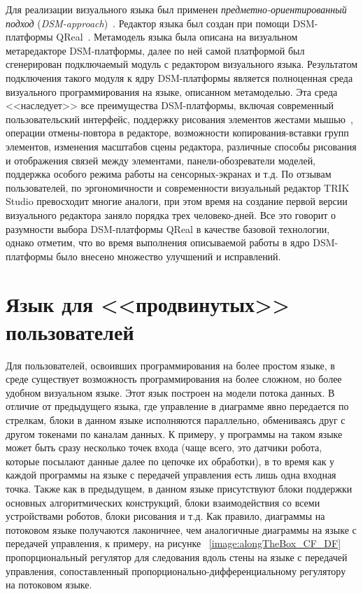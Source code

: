 \documentclass[a5paper]{article}
\begin{document}
Для реализации визуального языка был применен \textit{предметно-ориентированный подход} (\textit{DSM-approach})~\cite{koznov2008}. Редактор языка был создан при помощи DSM-платформы QReal~\cite{qrealMeta,kuzenkova2013qreal}. Метамодель языка была описана на визуальном метаредакторе DSM-платформы, далее по ней самой платформой был сгенерирован подключаемый модуль с редактором визуального языка. Результатом подключения такого модуля к ядру DSM-платформы является полноценная среда визуального программирования на языке, описанном метамоделью. Эта среда <<наследует>> все преимущества DSM-платформы, включая современный пользовательский интерфейс, поддержку рисования элементов жестами мышью~\cite{osechkina2010gestures,osechkina2012multistroke}, операции отмены-повтора в редакторе, возможности копирования-вставки групп элементов, изменения масштабов сцены редактора, различные способы рисования и отображения связей между элементами, панели-обозреватели моделей, поддержка особого режима работы на сенсорных-экранах и т.д. По отзывам пользователей, по эргономичности и современности визуальный редактор TRIK Studio превосходит многие аналоги, при этом время на создание первой версии визуального редактора заняло порядка трех человеко-дней. Все это говорит о разумности выбора DSM-платформы QReal в качестве базовой технологии, однако отметим, что во время выполнения описываемой работы в ядро DSM-платформы было внесено множество улучшений и исправлений.

\section{Язык для <<продвинутых>> пользователей}
\label{chapter:dataFlowLanguage}

Для пользователей, освоивших программирования на более простом языке, в среде существует возможность программирования на более сложном, но более удобном визуальном языке. Этот язык построен на модели потока данных. В отличие от предыдущего языка, где управление в диаграмме явно передается по стрелкам, блоки в данном языке исполняются параллельно, обмениваясь друг с другом токенами по каналам данных. К примеру, у программы на таком языке может быть сразу несколько точек входа (чаще всего, это датчики робота, которые посылают данные далее по цепочке их обработки), в то время как у каждой программы на языке с передачей управления есть лишь одна входная точка. Также как в предыдущем, в данном языке присутствуют блоки поддержки основных алгоритмических конструкций, блоки взаимодействия со всеми устройствами роботов, блоки рисования и т.д. Как правило, диаграммы на потоковом языке получаются лаконичнее, чем аналогичные диаграммы на языке с передачей управления, к примеру, на рисунке ~\ref{image:alongTheBox_CF_DF} пропорциональный регулятор для следования вдоль стены на языке с передачей управления, сопоставленный пропорционально-дифференциальному регулятору на потоковом языке.
\end{document}
